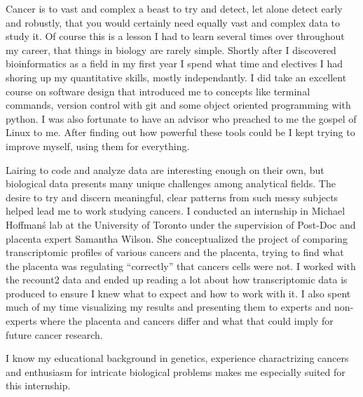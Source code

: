\documentclass[11pt, a4paper]{./Awesome-CV/awesome-cv}
\begin{document}
\makecvheader[C] %
\makelettertitle %
\begin{cvletter}
\hspace{0.8em}  Cancer is to vast and complex a beast to try and detect, let alone detect early and robustly, that you would certainly need equally vast and complex data to study it.
Of course this is a lesson I had to learn several times over throughout my career, that things in biology are rarely simple.
Shortly after I discovered bioinformatics as a field in my first  year I spend what time and electives I had shoring up my quantitative skills, mostly independantly.
I did take an excellent course on software design that introduced me to concepts like terminal commands, version control with git and some object oriented programming with python.
I was also fortunate to have an advisor who preached to me the gospel of Linux to me.
After finding out how powerful these tools could be I kept trying to improve myself, using them for everything.
\par
Lairing to code and analyze data are interesting enough on their own, but biological data presents many unique challenges among analytical fields.
The desire to try and discern meaningful, clear patterns from such messy subjects helped lead me to work studying cancers.
I conducted an internship in Michael Hoffman\'s lab at the University of Toronto under the supervision of Post-Doc and placenta expert Samantha Wilson.
She conceptualized the project of comparing transcriptomic profiles of various cancers and the placenta, trying to find what the placenta was regulating ``correctly'' that cancers cells were not.
I worked with the recount2 data and ended up reading a lot about how transcriptomic data is produced to ensure I knew what to expect and how to work with it.
I also spent much of my time visualizing my results and presenting them to experts and non-experts where the placenta and cancers differ and what that could imply for future cancer research.
\par
I know my educational background in genetics, experience charactrizing cancers and enthusiasm for intricate biological problems makes me especially suited for this internship.
\end{cvletter}
\makeletterclosing
{} %
\end{document}
